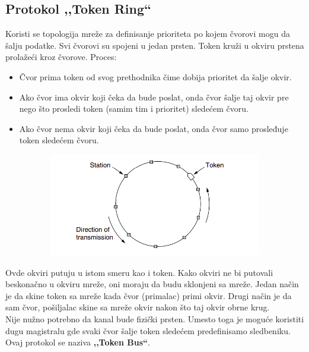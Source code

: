 \documentclass[a4paper]{article}
\begin{document}
    \subsection{Protokol ,,Token Ring``}
        Koristi se topologija mreže za definisanje prioriteta po kojem čvorovi mogu da šalju podatke.
        Svi čvorovi su spojeni u jedan prsten. Token kruži u okviru prstena prolažeći kroz čvorove.
        Proces:
        \begin{itemize}
            \item Čvor prima token od svog prethodnika čime dobija prioritet da šalje okvir.
            \item Ako čvor ima okvir koji čeka da bude poslat, onda čvor šalje taj okvir pre nego
                  što prosledi token (samim tim i prioritet) sledećem čvoru. 
            \item Ako čvor nema okvir koji čeka da bude poslat, onda čvor samo prosleđuje token 
                  sledećem čvoru.
        \end{itemize} 
        \begin{figure}[H]
            \begin{center}
                \includegraphics[width=120mm,height=45mm]{Slike/token.png}
            \end{center}
        \end{figure}
        Ovde okviri putuju u istom smeru kao i token. Kako okviri ne bi putovali beskonačno u okviru
        mreže, oni moraju da budu sklonjeni sa mreže. Jedan način je da skine token sa mreže kada čvor (primalac) 
        primi okvir. Drugi način je da sam čvor, pošiljalac skine sa mreže okvir nakon
        što taj okvir obrne krug.\\

        Nije nužno potrebno da kanal bude fizički prsten. Umesto toga je moguće koristiti dugu 
        magistralu gde svaki čvor šalje token sledećem predefinisamo sledbeniku. Ovaj protokol se
        naziva \textbf{,,Token Bus``}.

\newpage
\end{document}
